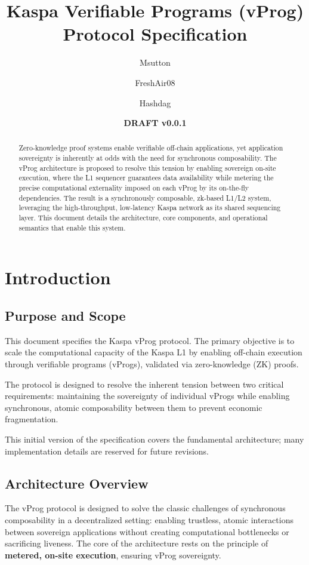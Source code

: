 \documentclass[onecolumn, 9pt, a4paper]{extarticle}
\title{Kaspa Verifiable Programs (vProg) Protocol Specification}
\date{\textbf{DRAFT v0.0.1}}
\author[1]{Msutton}
\author[1,2]{FreshAir08}
\author[1]{Hashdag}
\affil[1]{Kaspa Research}
\affil[2]{Kaspa Ecosystem Foundation (KEF)}
\begin{document}
\maketitle

\begin{abstract}
Zero-knowledge proof systems enable verifiable off-chain applications, yet application sovereignty is inherently at odds with the need for synchronous composability. 
The vProg architecture is proposed to resolve this tension by enabling sovereign on-site execution, where the L1 sequencer guarantees data availability while metering the precise computational externality imposed on each vProg by its on-the-fly dependencies. 
The result is a synchronously composable, zk-based L1/L2 system, leveraging the high-throughput, low-latency Kaspa network as its shared sequencing layer. This document details the architecture, core components, and operational semantics that enable this system.
\end{abstract}

\tableofcontents
\clearpage

\section{Introduction}

\subsection{Purpose and Scope}
This document specifies the Kaspa vProg protocol. The primary objective is to scale the computational capacity of the Kaspa L1 by enabling off-chain execution through verifiable programs (vProgs), validated via zero-knowledge (ZK) proofs.

The protocol is designed to resolve the inherent tension between two critical requirements: maintaining the sovereignty of individual vProgs while enabling synchronous, atomic composability between them to prevent economic fragmentation. 

This initial version of the specification covers the fundamental architecture; many implementation details are reserved for future revisions. 

\subsection{Architecture Overview}
The vProg protocol is designed to solve the classic challenges of synchronous composability in a decentralized setting: enabling trustless, atomic interactions between sovereign applications without creating computational bottlenecks or sacrificing liveness. The core of the architecture rests on the principle of \textbf{metered, on-site execution}, ensuring vProg sovereignty.
\end{document}
